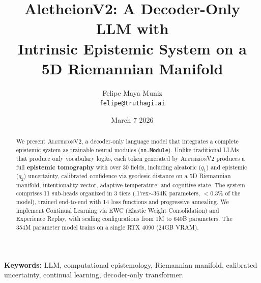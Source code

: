 \documentclass[11pt,a4paper]{article}
\title{
    \textbf{AletheionV2: A Decoder-Only LLM with\\
    Intrinsic Epistemic System on a\\
    5D Riemannian Manifold}
}
\author{
    Felipe Maya Muniz \\
    \texttt{felipe@truthagi.ai}
}
\date{March 7 2026}
\newcommand{\aletheion}{\textsc{AletheionV2}}
\begin{document}
\maketitle

\begin{abstract}
We present \aletheion{}, a decoder-only language model that integrates
a complete epistemic system as trainable neural modules (\texttt{nn.Module}).
Unlike traditional LLMs that produce only vocabulary logits, each token
generated by \aletheion{} produces a full \textbf{epistemic tomography}
with over 30 fields, including aleatoric ($q_1$) and epistemic ($q_2$)
uncertainty, calibrated confidence via geodesic distance on a 5D
Riemannian manifold, intentionality vector, adaptive temperature, and
cognitive state. The system comprises 11 sub-heads organized in 3 tiers
({\raise.17ex\hbox{$\scriptstyle\sim$}}364K parameters, $<$0.3\% of the model),
trained end-to-end with 14 loss functions and progressive annealing.
We implement Continual Learning via EWC (Elastic Weight Consolidation) and
Experience Replay, with scaling configurations from 1M to 640B parameters.
The 354M parameter model trains on a single RTX 4090 (24GB VRAM).
\end{abstract}

\textbf{Keywords:} LLM, computational epistemology, Riemannian manifold,
calibrated uncertainty, continual learning, decoder-only transformer.

\tableofcontents
\newpage
















\end{document}
